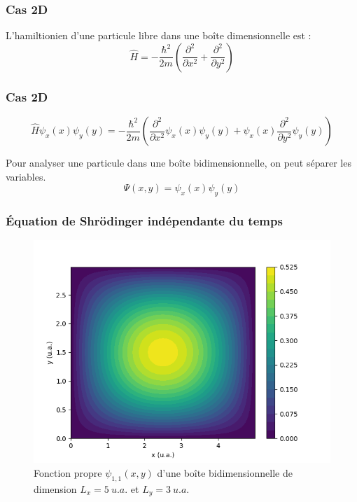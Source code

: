 \documentclass[aspectratio=169]{beamer}
\begin{document}
\begin{frame}
\frametitle{Cas 2D}
L'hamiltionien d'une particule libre dans une boîte dimensionnelle est :
\begin{equation}
\hat{H}=-\frac{\hbar^2}{2m}\left(\frac{\partial^2}{\partial x^2}+\frac{\partial^2}{\partial y^2}\right)
\end{equation}

\end{frame}


\begin{frame}
\frametitle{Cas 2D}
\begin{equation}
\hat{H}\psi_x(x)\psi_y(y)=-\frac{\hbar^2}{2m}\left(\frac{\partial^2}{\partial x^2}\psi_x(x)\psi_y(y)+\psi_x(x)\frac{\partial^2}{\partial y^2}\psi_y(y)\right)
\end{equation}

Pour analyser une particule dans une boîte bidimensionnelle, on peut séparer les variables. 
\begin{equation}
\Psi(x,y)=\psi_x(x)\psi_y(y)
\end{equation}
\end{frame}




\begin{frame}
\frametitle{Équation de Shrödinger indépendante du temps}
\begin{figure}[h]
\includegraphics[scale=0.5]{fct_propre2d_11}
\caption{Fonction propre $\psi_{1,1}(x,y)$ d'une boîte bidimensionnelle de dimension $L_x=5\ u.a.$ et $L_y=3\ u.a.$}
\end{figure}
\end{frame}
\end{document}

